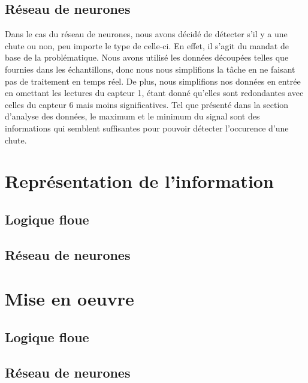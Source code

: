 \documentclass[12pt,letterpaper]{article}
\begin{document}
\subsection{Réseau de neurones} %
Dans le cas du réseau de neurones, nous avons décidé de détecter s'il y a une chute ou non, peu importe le type de celle-ci. En effet, il s'agit du mandat de base de la problématique. Nous avons utilisé les données découpées telles que fournies dans les échantillons, donc nous nous simplifions la tâche en ne faisant pas de traitement en temps réel. De plus, nous simplifions nos données en entrée en omettant les lectures du capteur 1, étant donné qu'elles sont redondantes avec celles du capteur 6 mais moins significatives. Tel que présenté dans la section d'analyse des données, le maximum et le minimum du signal sont des informations qui semblent suffisantes pour pouvoir détecter l'occurence d'une chute.

\section{Représentation de l'information}

\subsection{Logique floue}

\subsection{Réseau de neurones} %

\section{Mise en oeuvre}

\subsection{Logique floue}

\subsection{Réseau de neurones} %
\end{document}
